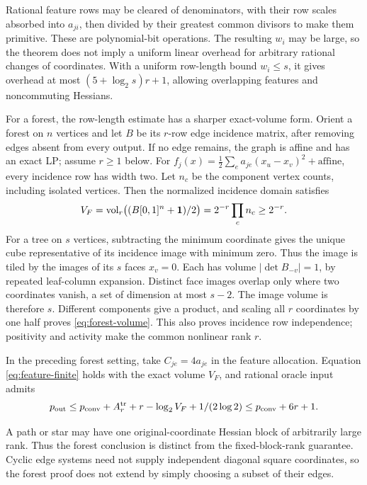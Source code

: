 Rational feature rows may be cleared of denominators, with their row
scales absorbed into $a_{ji}$, then divided by their greatest common
divisors to make them primitive. These are polynomial-bit operations.
The resulting $w_i$ may be large, so the theorem does not imply a
uniform linear overhead for arbitrary rational changes of coordinates.
With a uniform row-length bound $w_i\le s$, it gives overhead at most
$(5+\log_2s)r+1$, allowing overlapping features and noncommuting Hessians.

For a forest, the row-length estimate has a sharper exact-volume form.
Orient a forest on $n$ vertices and let $B$ be its $r$-row edge incidence
matrix, after removing edges absent from every output. If no edge remains,
the graph is affine and has an exact LP; assume $r\ge1$ below. For
$f_j(x)=\frac12\sum_ea_{je}(x_u-x_v)^2+\text{affine}$, every incidence
row has width two. Let $n_c$ be the component vertex counts, including
isolated vertices. Then the normalized incidence domain satisfies
\begin{equation}\label{eq:forest-volume}
 V_F=\operatorname{vol}_r\bigl((B[0,1]^n+\mathbf1)/2\bigr)
                    =2^{-r}\prod_cn_c\ge2^{-r}.
\end{equation}
For a tree on $s$ vertices, subtracting the minimum coordinate gives
the unique cube representative of its incidence image with minimum zero.
Thus the image is tiled by the images of its $s$ faces $x_v=0$.
Each has volume $|\det B_{-v}|=1$, by repeated leaf-column expansion.
Distinct face images overlap only where two coordinates vanish, a set
of dimension at most $s-2$. The image volume is therefore $s$.
Different components give a product, and scaling all $r$ coordinates
by one half proves \eqref{eq:forest-volume}. This also proves incidence
row independence; positivity and activity make the common nonlinear
rank $r$.

\begin{corollary}\label{cor:forest-precision}
In the preceding forest setting, take $C_{je}=4a_{je}$ in the feature
allocation. Equation \eqref{eq:feature-finite} holds with the exact
volume $V_F$, and rational oracle input admits
\[
 p_{\rm out}\le p_{\mathrm{conv}}+A_r^{\rm tr}+r-\log_2V_F+1/(2\log2)
                      \le p_{\mathrm{conv}}+6r+1.
\]
\end{corollary}
A path or star may have one original-coordinate Hessian block of
arbitrarily large rank. Thus the forest conclusion is distinct from
the fixed-block-rank guarantee. Cyclic edge systems need not supply
independent diagonal square coordinates, so the forest proof does not
extend by simply choosing a subset of their edges.

